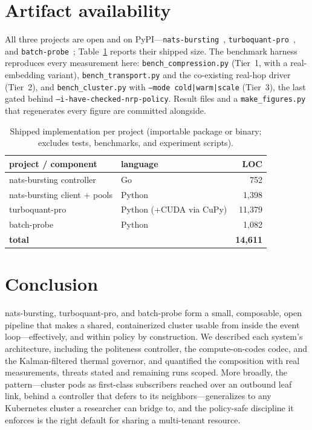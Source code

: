 \documentclass[conference]{IEEEtran}
\begin{document}
\section{Artifact availability}\label{sec:artifact}
All three projects are open and on PyPI---\texttt{nats-bursting}~\cite{natsbursting},
\texttt{turboquant-pro}~\cite{turboquantpro}, and \texttt{batch-probe}~\cite{batchprobe};
Table~\ref{tab:impl} reports their shipped size. The benchmark harness
reproduces every measurement here:
\texttt{bench\_compression.py} (Tier~1, with a real-embedding variant), \texttt{bench\_transport.py}
and the co-existing real-hop driver (Tier~2), and \texttt{bench\_cluster.py} with
\texttt{--mode cold|warm|scale} (Tier~3), the last gated behind \texttt{--i-have-checked-nrp-policy}.
Result files and a \texttt{make\_figures.py} that regenerates every figure are committed alongside.

\begin{table}[t]\centering\caption{Shipped implementation per project (importable package or
binary; excludes tests, benchmarks, and experiment scripts).}\label{tab:impl}
\begin{tabular}{llr}\toprule
project / component & language & LOC \\\midrule
nats-bursting controller & Go & 752 \\
nats-bursting client + pools & Python & 1{,}398 \\
turboquant-pro & Python (+CUDA via CuPy) & 11{,}379 \\
batch-probe & Python & 1{,}082 \\\midrule
\textbf{total} & & \textbf{14{,}611} \\\bottomrule
\end{tabular}
\end{table}

\section{Conclusion}
nats-bursting, turboquant-pro, and batch-probe form a small, composable, open pipeline that makes
a shared, containerized cluster usable from inside the event loop---effectively, and within
policy by construction. We described each system's architecture, including the politeness
controller, the compute-on-codes codec, and the Kalman-filtered thermal governor, and quantified
the composition with real measurements, threats stated and remaining runs scoped. More broadly,
the pattern---cluster pods as first-class subscribers reached over an outbound leaf link, behind a
controller that defers to its neighbors---generalizes to any Kubernetes cluster a researcher can
bridge to, and the policy-safe discipline it enforces is the right default for sharing a
multi-tenant resource.
\end{document}
